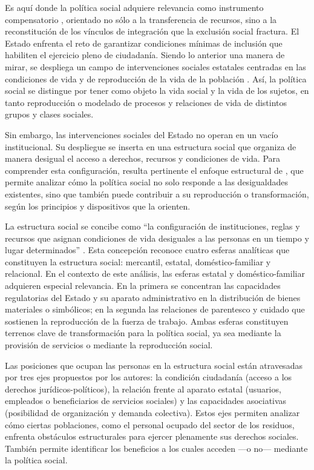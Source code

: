 \documentclass[
  spanish,
  11pt,
  a4paper,
]{scrbook}
\begin{document}
Es aquí donde la política social adquiere relevancia como instrumento
compensatorio \autocite{Cohen2005}, orientado no sólo a la transferencia
de recursos, sino a la reconstitución de los vínculos de integración que
la exclusión social fractura. El Estado enfrenta el reto de garantizar
condiciones mínimas de inclusión que habiliten el ejercicio pleno de
ciudadanía. Siendo lo anterior una manera de mirar, se despliega un
campo de intervenciones sociales estatales centradas en las condiciones
de vida y de reproducción de la vida de la población
\autocite{Danani2017}. Así, la política social se distingue por tener
como objeto la vida social y la vida de los sujetos, en tanto
reproducción o modelado de procesos y relaciones de vida de distintos
grupos y clases sociales.

Sin embargo, las intervenciones sociales del Estado no operan en un
vacío institucional. Su despliegue se inserta en una estructura social
que organiza de manera desigual el acceso a derechos, recursos y
condiciones de vida. Para comprender esta configuración, resulta
pertinente el enfoque estructural de \textcite{Adelantado1998}, que
permite analizar cómo la política social no solo responde a las
desigualdades existentes, sino que también puede contribuir a su
reproducción o transformación, según los principios y dispositivos que
la orienten.

La estructura social se concibe como ``la configuración de
instituciones, reglas y recursos que asignan condiciones de vida
desiguales a las personas en un tiempo y lugar determinados''
\autocite{Adelantado1998}. Esta concepción reconoce cuatro esferas
analíticas que constituyen la estructura social: mercantil, estatal,
doméstico-familiar y relacional. En el contexto de este análisis, las
esferas estatal y doméstico-familiar adquieren especial relevancia. En
la primera se concentran las capacidades regulatorias del Estado y su
aparato administrativo en la distribución de bienes materiales o
simbólicos; en la segunda las relaciones de parentesco y cuidado que
sostienen la reproducción de la fuerza de trabajo. Ambas esferas
constituyen terrenos clave de transformación para la política social, ya
sea mediante la provisión de servicios o mediante la reproducción
social.

Las posiciones que ocupan las personas en la estructura social están
atravesadas por tres ejes propuestos por los autores: la condición
ciudadanía (acceso a los derechos jurídicos-políticos), la relación
frente al aparato estatal (usuarios, empleados o beneficiarios de
servicios sociales) y las capacidades asociativas (posibilidad de
organización y demanda colectiva). Estos ejes permiten analizar cómo
ciertas poblaciones, como el personal ocupado del sector de los
residuos, enfrenta obstáculos estructurales para ejercer plenamente sus
derechos sociales. También permite identificar los beneficios a los
cuales acceden ---o no--- mediante la política social.
\end{document}
